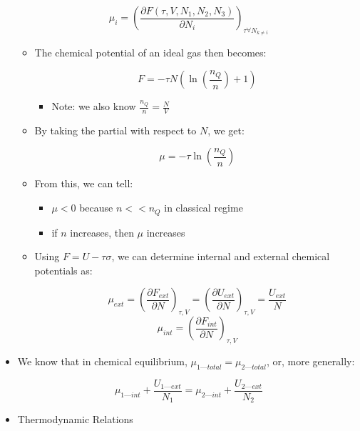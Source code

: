 \begin{itemize}
    $$\mu_i=\left(  \frac{\partial F(\tau,V,N_1,N_2,N_3)}{\partial N_i}\right)_{\tau\forall N_{k\neq i}}$$

    \begin{itemize}

      \item The chemical potential of an ideal gas then becomes:

        $$F=-\tau N\left( \ln\left( \frac{n_Q}{n} \right)+1 \right)$$

        \begin{itemize}

          \item Note: we also know $\frac{n_Q}{n}=\frac{N}{V}$

        \end{itemize}

      \item By taking the partial with respect to $N$, we get:

        $$\mu=-\tau\ln\left( \frac{n_Q}{n} \right)$$

      \item From this, we can tell:

        \begin{itemize}

          \item $\mu<0$ because $n<<n_Q$ in classical regime

          \item if $n$ increases, then $\mu$ increases

        \end{itemize}

      \item Using $F=U-\tau\sigma$, we can determine internal and external chemical potentials as:

        $$\mu_{ext}=\left( \frac{\partial F_{ext}}{\partial N} \right)_{\tau,V}=\left( \frac{\partial U_{ext}}{\partial N} \right)_{\tau,V}=\frac{U_{ext}}{N}$$
        $$\mu_{int}=\left( \frac{\partial F_{int}}{\partial N} \right)_{\tau,V}$$

    \end{itemize}

  \item We know that in chemical equilibrium, $\mu_{1—total}=\mu_{2—total}$, or, more generally:

    $$\mu_{1—int}+\frac{U_{1—ext}}{N_1}=\mu_{2—int}+\frac{U_{2—ext}}{N_2}$$

  \item Thermodynamic Relations


\end{itemize}

